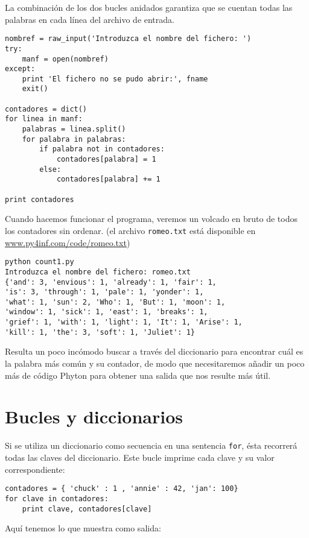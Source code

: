 La combinación de los dos bucles anidados garantiza que se cuentan
todas las palabras en cada línea del archivo de entrada.

\beforeverb
\begin{verbatim}
nombref = raw_input('Introduzca el nombre del fichero: ')
try:
    manf = open(nombref)
except:
    print 'El fichero no se pudo abrir:', fname
    exit()

contadores = dict()
for linea in manf:
    palabras = linea.split()
    for palabra in palabras:
        if palabra not in contadores:
            contadores[palabra] = 1
        else:
            contadores[palabra] += 1

print contadores
\end{verbatim}
\afterverb
%
Cuando hacemos funcionar el programa, veremos un volcado en bruto
de todos los contadores sin ordenar.
(el archivo {\tt romeo.txt} está disponible en
\url{www.py4inf.com/code/romeo.txt})

\beforeverb
\begin{verbatim}
python count1.py 
Introduzca el nombre del fichero: romeo.txt
{'and': 3, 'envious': 1, 'already': 1, 'fair': 1, 
'is': 3, 'through': 1, 'pale': 1, 'yonder': 1, 
'what': 1, 'sun': 2, 'Who': 1, 'But': 1, 'moon': 1, 
'window': 1, 'sick': 1, 'east': 1, 'breaks': 1, 
'grief': 1, 'with': 1, 'light': 1, 'It': 1, 'Arise': 1, 
'kill': 1, 'the': 3, 'soft': 1, 'Juliet': 1}
\end{verbatim}
\afterverb
%
Resulta un poco incómodo buscar a través del diccionario para encontrar
cuál es la palabra más común y su contador, de modo que necesitaremos añadir un poco
más de código Phyton para obtener una salida que nos resulte más útil.

\section{Bucles y diccionarios}


Si se utiliza un diccionario como secuencia
en una sentencia {\tt for}, ésta recorrerá todas
las claves del diccionario. Este bucle
imprime cada clave y su valor correspondiente:

\beforeverb
\begin{verbatim}
contadores = { 'chuck' : 1 , 'annie' : 42, 'jan': 100}
for clave in contadores:
    print clave, contadores[clave]
\end{verbatim}
\afterverb
%
Aquí tenemos lo que muestra como salida:

